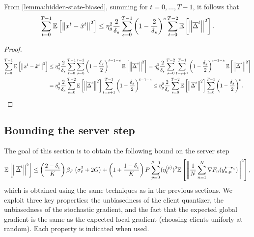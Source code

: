 \begin{corollary}  \label{cor:sum-biased-terms}
    From \cref{lemma:hidden-state-biased}, summing for $t = 0, \ldots, T-1$, it follows that
    \begin{equation}
        \sum_{t=0}^{T-1} \mathbb{E}\left[ \left\lVert x^{t} - \hat x^{t}\right\rVert^2 \right]  \leq \eta_g^2\frac{2}{\delta_s} \sum_{s=0}^{T-1} \left( 1-\frac{2}{\delta_s} \right)^s \sum_{t=0}^{T-2} \mathbb{E}\left[ \left\lVert\overline{\Delta}^t\right\rVert^2\right].
    \end{equation}
\end{corollary}
\begin{proof}
    \begin{equation}
        \begin{aligned}
            \sum_{t=0}^{T-1} \mathbb{E}\left[ \left\lVert x^{t} - \hat x^{t}\right\rVert^2 \right] & \leq  \eta_g^2 \frac{2}{\delta_s} \sum_{t=0}^{T-1} \sum_{s=0}^{t-1} \left(1- \frac{\delta_s}{2 } \right)^{t-1-s} \mathbb{E}\left[ \left\lVert\overline{\Delta}^s\right\rVert^2 \right] = \eta_g^2 \frac{2}{\delta_s}  \sum_{s=0}^{T-2} \sum_{t=s+1}^{T-1} \left( 1 - \frac{\delta_s}{2} \right)^{t-1-s} \mathbb{E}\left[ \left\lVert\overline{\Delta}^s\right\rVert^2 \right] \\
                                                                   & = \eta_g^2 \frac{2}{\delta_s} \sum_{s=0}^{T-2} \mathbb{E}\left[\left\lVert\overline{\Delta}^s\right\rVert^2\right] \sum_{t=s+1}^{T-1} \left( 1 - \frac{\delta_s}{2} \right)^{t-1-s} \leq \eta_g^2 \frac{2}{\delta_s} \sum_{s=0}^{T-2} \mathbb{E}\left[\left\lVert\overline{\Delta}^s\right\rVert^2\right] \sum_{t=0}^{T-1} \left( 1 - \frac{\delta_s}{2} \right)^t.
        \end{aligned}
    \end{equation}
\end{proof}

\subsection{Bounding the server step}
\label{sec:bounding-server-step}
The goal of this section is to obtain the following bound on the server step
\begin{equation}
    \mathbb{E}\left[\left\lVert\overline{\Delta}^t \right\rVert^2\right] \leq \left(\frac{2-\delta_c}{K}\right)\beta_P \left(\sigma_{\ell}^2 + 2G\right) + \left(1 + \frac{1-\delta_c}{K}\right)P  \sum_{p=0}^{P-1}   (\eta^{(p)}_{\ell})^2 \mathbb{E}\left[\left\lVert\frac{1}{N} \sum_{n = 1}^N \nabla F_n(y^{t-\tau_n}_{n,p}) \right\rVert^2\right],
\end{equation}
which is obtained using the same techniques as in the previous sections.
We exploit three key properties: the unbiasedness of the client quantizer, the unbiasedness of the stochastic gradient, and the fact that the expected global gradient is the same as the expected local gradient (choosing clients uniforly at random).
Each property is indicated when used.

